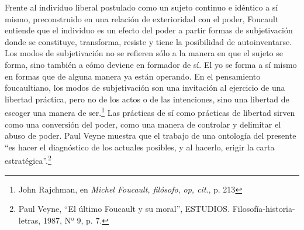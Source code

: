 Frente al individuo liberal postulado como un sujeto continuo e idéntico a sí mismo, preconstruido en una relación de exterioridad con el poder, Foucault entiende que el individuo es un efecto del poder a partir formas de subjetivación donde se constituye, transforma, resiste y tiene la posibilidad de autoinventarse. Los modos de subjetivación no se refieren sólo a la manera en que el sujeto se forma, sino también a cómo deviene en formador de sí. El yo se forma a sí mismo en formas que de alguna manera ya están operando. En el pensamiento foucaultiano, los modos de subjetivación son una invitación al ejercicio de una libertad práctica, pero no de los actos o de las intenciones, sino una libertad de escoger una manera de ser.\footnote{John Rajchman, en \emph{Michel Foucault, filósofo,} \emph{op, cit}., p. 213} Las prácticas de sí como prácticas de libertad sirven como una conversión del poder, como una manera de controlar y delimitar el abuso de poder. Paul Veyne muestra que el trabajo de una ontología del presente \enquote{es hacer el diagnóstico de los actuales posibles, y al hacerlo, erigir la carta estratégica}.\footnote{Paul Veyne, \enquote{El último Foucault y su moral\emph{}}, ESTUDIOS. Filosofía-historia-letras, 1987, Nº 9, p. 7.}

